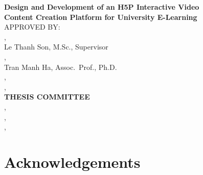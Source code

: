 \documentclass[12pt,a4paper,oneside]{report}
\begin{document}
\clearpage
\thispagestyle{empty}
\begin{center}
  {\large\bfseries Design and Development of an H5P Interactive Video\\
  Content Creation Platform for University E-Learning}\\[30pt]
  APPROVED BY:\\[20pt]
  \underline{\hspace{8cm}} , \\
  Le Thanh Son, M.Sc., Supervisor\\[20pt]
  \underline{\hspace{8cm}} ,\\
  Tran Manh Ha, Assoc.\ Prof., Ph.D.\\[20pt]
  \underline{\hspace{8cm}} ,\\
  \underline{\hspace{8cm}} ,\\[20pt]
  {\bfseries THESIS COMMITTEE}\\[20pt]
  \underline{\hspace{8cm}} ,\\
  \underline{\hspace{8cm}} ,\\
  \underline{\hspace{8cm}} ,\\
  \underline{\hspace{8cm}}
\end{center}

\clearpage
\chapter*{Acknowledgements}


\clearpage
\tableofcontents

\clearpage
\listoffigures
{}

\clearpage
\listoftables
{}

\clearpage
\end{document}
